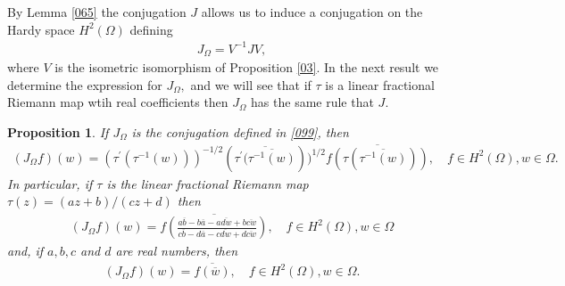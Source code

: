 \documentclass[11pt]{amsart}%
\newtheorem{pps}[thm]{Proposition}
\theoremstyle{definition}
\theoremstyle{remark}
\numberwithin{equation}{section}
\begin{document}
By Lemma \ref{065} the conjugation $J$ allows us to induce a conjugation on
the Hardy space $H^{2}(\Omega)$ defining
\begin{align}\label{099}
J_{\Omega}=V^{-1}JV,
\end{align}
where $V$ is the isometric isomorphism of Proposition \ref{03}. In the next
result we determine the expression for $J_{\Omega},$ and we will see that if
$\tau$ is a linear fractional Riemann map wtih real coefficients then
$J_{\Omega}$ has the same rule that $J.$

\begin{pps}
\label{012} If $J_{\Omega}$ is the conjugation defined in \eqref{099}, then 
\begin{align*}
(J_{\Omega}f)(w)= (\tau^{\prime}(\tau^{-1}(w)))^{-1/2}( \overline{\tau
^{\prime}( \overline{\tau^{-1}(w)}}))^{1/2} \overline{f( \tau( \overline
{\tau^{-1}(w)}))},\quad f\in H^{2}(\Omega),w\in\Omega.
\end{align*}
In particular, if $\tau$ is the linear fractional Riemann map $\tau
(z)=(az+b)/(cz+d)$ then
\begin{align*}
(J_{\Omega}f)(w)=\overline{f\left(  \frac{a\overline{b}-b\overline
{a}-a\overline{dw}+b\overline{cw}}{c\overline{b}-d\overline{a}-c\overline
{dw}+d\overline{cw}} \right)  }, \quad f\in H^{2}(\Omega), w\in\Omega
\end{align*}
and, if $a,b,c$ and $d$ are real numbers, then
\begin{align*}
(J_{\Omega}f)(w)=\overline{f(\overline{w})}, \quad f\in H^{2}(\Omega),
w\in\Omega.
\end{align*}

\end{pps}
\end{document}
